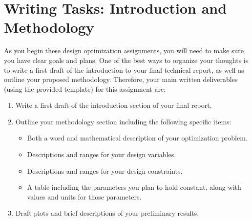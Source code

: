 \documentclass[11pt]{article}
\begin{document}
	
	
	

\section{Writing Tasks: Introduction and Methodology}

As you begin these design optimization assignments, you will need to make sure you have clear goals and plans.
One of the best ways to organize your thoughts is to write a first draft of the introduction to your final technical report, as well as outline your proposed methodology.
Therefore, your main written deliverables (using the provided template) for this assignment are:

\begin{enumerate}[label=\alph*.]
	\item Write a first draft of the introduction section of your final report.
	\item Outline your methodology section including the following specific items:
	\begin{itemize}
		\item Both a word and mathematical description of your optimization problem.
		\item Descriptions and ranges for your design variables.
		\item Descriptions and ranges for your design constraints.
		\item A table including the parameters you plan to hold constant, along with values and units for those parameters.
	\end{itemize}
	\item Draft plots and brief descriptions of your preliminary results.
\end{enumerate}

	
	
\end{document}
